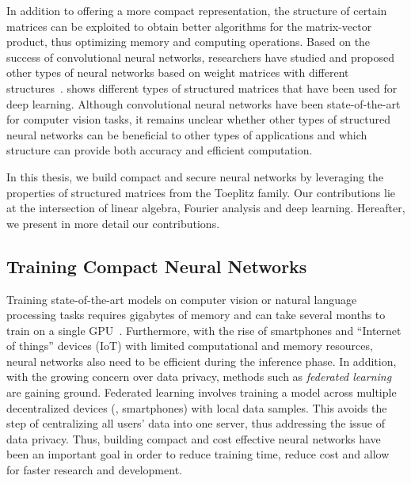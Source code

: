 In addition to offering a more compact representation, the structure of certain matrices can be exploited to obtain better algorithms for the matrix-vector product, thus optimizing memory and computing operations.
Based on the success of convolutional neural networks, researchers have studied and proposed other types of neural networks based on weight matrices with different structures~\cite{moczulski2016acdc,sindhwani2015structured,denil2013predicting}.
 shows different types of structured matrices that have been used for deep learning.
Although convolutional neural networks have been state-of-the-art for computer vision tasks, it remains unclear whether other types of structured neural networks can be beneficial to other types of applications and which structure can provide both accuracy and efficient computation.


In this thesis, we build compact and secure neural networks by leveraging the properties of structured matrices from the Toeplitz family.
Our contributions lie at the intersection of linear algebra, Fourier analysis and deep learning.
Hereafter, we present in more detail our contributions.

\subsection{Training Compact Neural Networks}
\label{subsection:ch1-training_compact_neural_networks}

Training state-of-the-art models on computer vision or natural language processing tasks requires gigabytes of memory and can take several months to train on a single GPU~\cite{krizhevsky2012imagenet,brown2020language}.
Furthermore, with the rise of smartphones and ``Internet of things'' devices (IoT) with limited computational and memory resources, neural networks also need to be efficient during the inference phase.
In addition, with the growing concern over data privacy, methods such as \emph{federated learning} are gaining ground.
Federated learning involves training a model across multiple decentralized devices (\eg, smartphones) with local data samples. 
This avoids the step of centralizing all users' data into one server, thus addressing the issue of data privacy.  
Thus, building compact and cost effective neural networks have been an important goal in order to reduce training time, reduce cost and allow for faster research and development.

